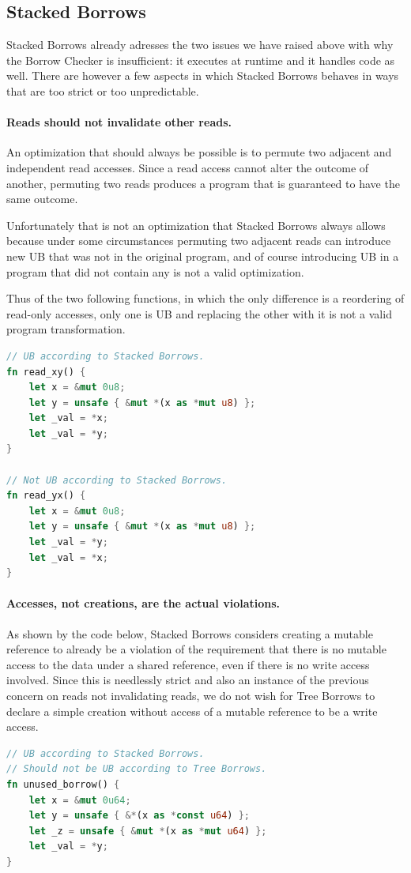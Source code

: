 \documentclass[a4paper,11pt]{article}
\theoremstyle{plain}
\theoremstyle{definition}
\theoremstyle{remark}
\newcommand{\tcode}[1]{\rstinline{#1}}
\begin{document}
\subsection{Stacked Borrows}

Stacked Borrows already adresses the two issues we have raised above with
why the Borrow Checker is insufficient: it executes at runtime and it handles
\tcode{unsafe} code as well. There are however a few aspects in which
Stacked Borrows behaves in ways that are too strict or too unpredictable.

\paragraph*{Reads should not invalidate other reads.}
An optimization that should always be possible is to permute two adjacent and independent
read accesses. Since a read access cannot alter the outcome of another, permuting
two reads produces a program that is guaranteed to have the same outcome.

Unfortunately that is not an optimization that Stacked Borrows always allows
because under some circumstances permuting two adjacent reads can introduce new
UB that was not in the original program, and of course introducing UB in a program
that did not contain any is not a valid optimization.

Thus of the two following functions, in which the only difference is a reordering
of read-only accesses, only one is UB and replacing the other with it is not
a valid program transformation.
\begin{lstlisting}[language=rust]
// UB according to Stacked Borrows.
fn read_xy() {
    let x = &mut 0u8;
    let y = unsafe { &mut *(x as *mut u8) };
    let _val = *x;
    let _val = *y;
}

// Not UB according to Stacked Borrows.
fn read_yx() {
    let x = &mut 0u8;
    let y = unsafe { &mut *(x as *mut u8) };
    let _val = *y;
    let _val = *x;
}
\end{lstlisting}

\paragraph*{Accesses, not creations, are the actual violations.}
As shown by the code below, Stacked Borrows considers creating a mutable reference
to already be a violation of the requirement that there is no mutable access to
the data under a shared reference, even if there is no write access involved.
Since this is needlessly strict and also an instance of the previous concern on
reads not invalidating reads, we do not wish for Tree Borrows to declare a simple
creation without access of a mutable reference to be a write access.
\begin{lstlisting}[language=rust]
// UB according to Stacked Borrows.
// Should not be UB according to Tree Borrows.
fn unused_borrow() {
    let x = &mut 0u64;
    let y = unsafe { &*(x as *const u64) };
    let _z = unsafe { &mut *(x as *mut u64) };
    let _val = *y;
}
\end{lstlisting}
\end{document}
